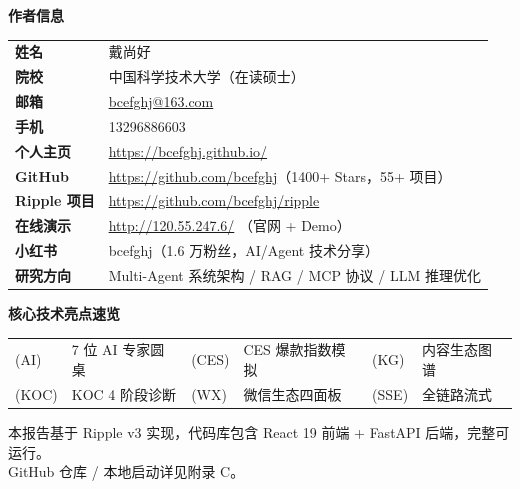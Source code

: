 \documentclass[12pt,a4paper]{ctexart}
\begin{document}
\begin{tcolorbox}[colback=lightbg,colframe=secondary,arc=6pt,
  left=12pt,right=12pt,top=10pt,bottom=10pt]
\begin{center}
{\large\bfseries\color{secondary} 作者信息}
\end{center}
\vspace{0.3cm}

\begin{tabular}{p{3.5cm} p{10cm}}
\textbf{姓名} & 戴尚好 \\[4pt]
\textbf{院校} & 中国科学技术大学（在读硕士）\\[4pt]
\textbf{邮箱} & \href{mailto:bcefghj@163.com}{bcefghj@163.com} \\[4pt]
\textbf{手机} & 13296886603 \\[4pt]
\textbf{个人主页} & \url{https://bcefghj.github.io/} \\[4pt]
\textbf{GitHub} & \url{https://github.com/bcefghj}（1400+ Stars，55+ 项目）\\[4pt]
\textbf{Ripple 项目} & \url{https://github.com/bcefghj/ripple} \\[4pt]
\textbf{在线演示} & \url{http://120.55.247.6/} （官网 + Demo）\\[4pt]
\textbf{小红书} & bcefghj（1.6 万粉丝，AI/Agent 技术分享）\\[4pt]
\textbf{研究方向} & Multi-Agent 系统架构 / RAG / MCP 协议 / LLM 推理优化 \\
\end{tabular}
\end{tcolorbox}

\vspace{0.8cm}

\begin{tcolorbox}[colback=primary!5,colframe=primary!30,arc=6pt,
  left=12pt,right=12pt,top=8pt,bottom=8pt]
\begin{center}
\textbf{核心技术亮点速览}
\end{center}
\vspace{0.2cm}
\begin{tabular}{p{1.2cm} p{4cm} p{1.2cm} p{4cm} p{1.2cm} p{3cm}}
(AI) & 7 位 AI 专家圆桌 &
(CES) & CES 爆款指数模拟 &
(KG) & 内容生态图谱 \\[4pt]
(KOC) & KOC 4 阶段诊断 &
(WX) & 微信生态四面板 &
(SSE) & 全链路流式 \\
\end{tabular}
\end{tcolorbox}

\vspace*{\fill}
\begin{center}
\small\color{textmuted}
本报告基于 Ripple v3 实现，代码库包含 React 19 前端 + FastAPI 后端，完整可运行。\\
GitHub 仓库 / 本地启动详见附录 C。
\end{center}
\end{document}
